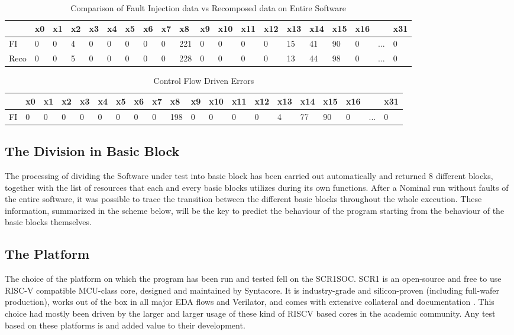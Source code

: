 \documentclass[./dissertation.tex]{subfiles}
\begin{document}
\begin{table*}[!ht]
    \centering
    \caption{Comparison of Fault Injection data vs Recomposed data on Entire Software}
    \begin{tabular}{|l|l|l|l|l|l|l|l|l|l|l|l|l|l|l|l|l|l|l|l|}
    \hline
        ~ & x0 & x1 & x2 & x3 & x4 & x5 & x6 & x7 & x8 & x9 & x10 & x11 & x12 & x13 & x14 & x15 & x16 & ~ & x31 \\ \hline
        FI & 0 & 0 & 4 & 0 & 0 & 0 & 0 & 0 & 221 & 0 & 0 & 0 & 0 & 15 & 41 & 90 & 0 & ... & 0 \\ \hline
        Reco & 0 & 0 & 5 & 0 & 0 & 0 & 0 & 0 & 228 & 0 & 0 & 0 & 0 & 13 & 44 & 98 & 0 & ... & 0 \\ \hline
    \end{tabular}
\end{table*}

\begin{table*}[!ht]
    \centering
    \caption{Control Flow Driven Errors}
    \begin{tabular}{|l|l|l|l|l|l|l|l|l|l|l|l|l|l|l|l|l|l|l|l|}
    \hline
        ~ & x0 & x1 & x2 & x3 & x4 & x5 & x6 & x7 & x8 & x9 & x10 & x11 & x12 & x13 & x14 & x15 & x16 & ~ & x31 \\ \hline
        FI & 0 & 0 & 0 & 0 & 0 & 0 & 0 & 0 & 198 & 0 & 0 & 0 & 0 & 4 & 77 & 90 & 0 & ... & 0 \\ \hline
    \end{tabular}
\end{table*}
\subsection{The Division in Basic Block}
The processing of dividing the Software under test into basic block has been carried out automatically and returned 8 different blocks, together with the list of resources that each and every basic blocks utilizes during its own functions.
After a Nominal run without faults of the entire software, it was possible to trace the transition between the different basic blocks throughout the whole execution. These information, summarized in the scheme below, will be the key to predict the behaviour of the program starting from the behaviour of the basic blocks themselves.




\subsection{The Platform}
The choice of the platform on which the program has been run and tested fell on the SCR1SOC. SCR1 is an open-source and free to use RISC-V compatible MCU-class core, designed and maintained by Syntacore. It is industry-grade and silicon-proven (including full-wafer production), works out of the box in all major EDA flows and Verilator, and comes with extensive collateral and documentation \cite{}. This choice had mostly been driven by the larger and larger usage of these kind of RISCV based cores in the academic community. Any test based on these platforms is and added value to their development. 
\end{document}
